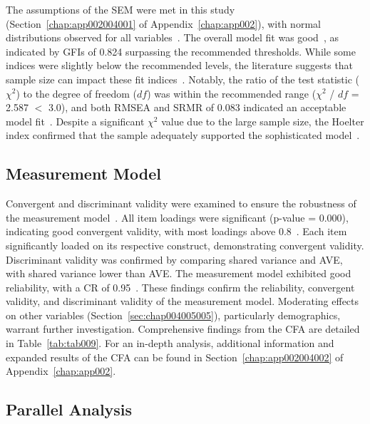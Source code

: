 The assumptions of the \ac{SEM} were met in this study (Section~\ref{chap:app002004001} of Appendix~\ref{chap:app002}), with normal distributions observed for all variables~\cite{CALISTO2022102922}.
The overall model fit was good~\cite{doi:10.1504/IJMDA.2017.087624}, as indicated by \acp{GFI} of 0.824 surpassing the recommended thresholds.
While some indices were slightly below the recommended levels, the literature suggests that sample size can impact these fit indices~\cite{doi:10.1080/00273171.2019.1602503}.
Notably, the ratio of the test statistic ($\chi^2$) to the degree of freedom ($df$) was within the recommended range ($\chi^2$ / $df$ = 2.587 $<$ 3.0), and both \ac{RMSEA} and \ac{SRMR} of 0.083 indicated an acceptable model fit~\cite{ZHOU2010760}.
Despite a significant $\chi^2$ value due to the large sample size, the Hoelter index confirmed that the sample adequately supported the sophisticated model~\cite{CALISTO2022102922}.

\subsection{Measurement Model}
\label{sec:chap004005002}

Convergent and discriminant validity were examined to ensure the robustness of the measurement model~\cite{CALISTO2022102922}.
All item loadings were significant (p-value = 0.000), indicating good convergent validity, with most loadings above 0.8~\cite{CALISTO2022102922}.
Each item significantly loaded on its respective construct, demonstrating convergent validity.
Discriminant validity was confirmed by comparing shared variance and \ac{AVE}, with shared variance lower than \ac{AVE}.
The measurement model exhibited good reliability, with a \ac{CR} of 0.95~\cite{doi:10.1504/IJMDA.2017.087624}.
These findings confirm the reliability, convergent validity, and discriminant validity of the measurement model.
Moderating effects on other variables (Section~\ref{sec:chap004005005}), particularly demographics, warrant further investigation.
\textcolor{revised}{Comprehensive findings from the \ac{CFA} are detailed in Table~\ref{tab:tab009}.
For an in-depth analysis, additional information and expanded results of the \ac{CFA} can be found in Section~\ref{chap:app002004002} of Appendix~\ref{chap:app002}.}



\subsection{Parallel Analysis}
\label{sec:chap004005003}


